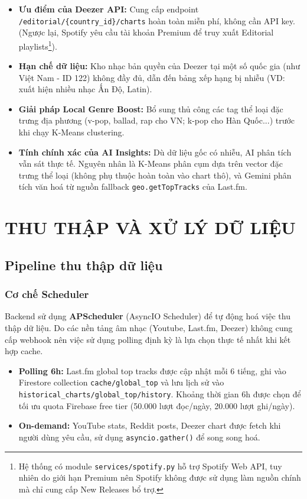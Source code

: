 \documentclass[12pt,a4paper]{report}
\begin{document}
\begin{itemize}[leftmargin=*]
    \item \textbf{Ưu điểm của Deezer API:} Cung cấp endpoint \texttt{/editorial/\{country\_id\}/charts} hoàn toàn miễn phí, không cần API key. (Ngược lại, Spotify yêu cầu tài khoản Premium để truy xuất Editorial playlists\footnote{Hệ thống có module \texttt{services/spotify.py} hỗ trợ Spotify Web API, tuy nhiên do giới hạn Premium nên Spotify không được sử dụng làm nguồn chính mà chỉ cung cấp New Releases bổ trợ.}).
    \item \textbf{Hạn chế dữ liệu:} Kho nhạc bản quyền của Deezer tại một số quốc gia (như Việt Nam - ID 122) không đầy đủ, dẫn đến bảng xếp hạng bị nhiễu (VD: xuất hiện nhiều nhạc Ấn Độ, Latin).
    \item \textbf{Giải pháp Local Genre Boost:} Bổ sung thủ công các tag thể loại đặc trưng địa phương (v-pop, ballad, rap cho VN; k-pop cho Hàn Quốc...) trước khi chạy K-Means clustering.
    \item \textbf{Tính chính xác của AI Insights:} Dù dữ liệu gốc có nhiễu, AI phân tích vẫn sát thực tế. Nguyên nhân là K-Means phân cụm dựa trên vector đặc trưng thể loại (không phụ thuộc hoàn toàn vào chart thô), và Gemini phân tích văn hoá từ nguồn fallback \texttt{geo.getTopTracks} của Last.fm.
\end{itemize}

\chapter{THU THẬP VÀ XỬ LÝ DỮ LIỆU}

\section{Pipeline thu thập dữ liệu}

\subsection{Cơ chế Scheduler}

Backend sử dụng \textbf{APScheduler} (AsyncIO Scheduler) để tự động hoá việc thu thập dữ liệu. Do các nền tảng âm nhạc (Youtube, Last.fm, Deezer) không cung cấp webhook nên việc sử dụng polling định kỳ là lựa chọn thực tế nhất khi kết hợp cache.

\begin{itemize}
    \item \textbf{Polling 6h:} Last.fm global top tracks được cập nhật mỗi 6 tiếng, ghi vào Firestore collection \texttt{cache/global\_top} và lưu lịch sử vào \texttt{historical\_charts/\allowbreak{}global\_top/history}. Khoảng thời gian 6h được chọn để tối ưu quota Firebase free tier (50.000 lượt đọc/ngày, 20.000 lượt ghi/ngày).
    \item \textbf{On-demand:} YouTube stats, Reddit posts, Deezer chart được fetch khi người dùng yêu cầu, sử dụng \texttt{asyncio.gather()} để song song hoá.
\end{itemize}
\end{document}
